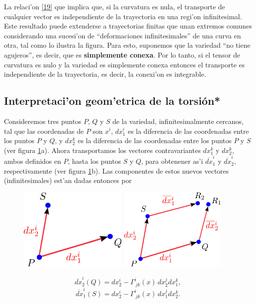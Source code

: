 La relaci'on \eqref{19} que implica que, si la curvatura es nula, el transporte de cualquier vector es independiente de la trayectoria en una regi'on infinitesimal. Este resultado puede extenderse a trayectorias finitas que unan extremos comunes considerando una sucesi'on de ``deformaciones infinitesimales'' de una curva en otra, tal como lo ilustra la figura. Para esto, suponemos que la variedad ``no tiene agujeros'', es decir, que es \textbf{simplemente conexa}. Por lo tanto, si el tensor de curvatura es nulo y la variedad es simplemente conexa entonces el transporte es independiente de la trayectoria, es decir, la conexi'on es integrable.

\subsection{Interpretaci'on geom'etrica de la torsi\'on*}
Consideremos tres puntos $P$, $Q$ y $S$ de la variedad, infinitesimalmente
cercanos, tal que las coordenadas de $P$ son $x^i $, $dx_1^i $ es la
diferencia de las coordenadas entre los puntos $P$ y $Q$, y $dx_2^k $ es la
diferencia de las coordenadas entre los puntos $P$ y $S$ (ver figura \ref{fig:torsion}a). 
Ahora transportamos los vectores contravariantes $dx_1^k $ y $dx_2^k $, ambos definidos en $P$, hasta los puntos $S$ y $Q$, para obtenener as'i $\overline{dx}^i_1$ y $\overline{dx}^i_2$, respectivamente (ver figura \ref{fig:torsion}b). Las componentes de estos nuevos vectores (infinitesimales) est'an dadas entonces por
\begin{center}
\begin{figure}[H]
\centerline{\includegraphics[height=4cm]{fig/fig-torsion-01.pdf}
\hspace{1cm}\includegraphics[height=4cm]{fig/fig-torsion-02.pdf}}
\caption{}
\label{fig:torsion}
\end{figure}
\end{center}
\begin{equation}
\overline{dx}_2^i (Q)=dx_2^i -\Gamma_{\ jk}^i(x)\, dx_2^j dx_1^k ,
\end{equation}
\begin{equation}
\overline{dx}_1^i (S)=dx_2^i -\Gamma_{\ jk}^i(x)\, dx_1^j dx_2^k .
\end{equation}

